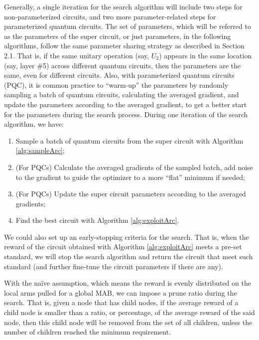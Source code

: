 \documentclass[a4paper,onecolumn,11pt]{quantumarticle}
\begin{document}
    
Generally, a single iteration for the search algorithm will include two steps for non-parameterized circuits, and two more parameter-related steps for parameterized quantum circuits. The set of parameters, which will be referred to as the parameters of the super circuit, or just parameters, in the following algorithms, follow the same parameter sharing strategy as described in Section 2.1. That is, if the same unitary operation (say, $U_2$) appears in the same location (say, layer \#5) across different quantum circuits, then the parameters are the same, even for different circuits. Also, with parameterized quantum circuits (PQC), it is common practice to ``warm-up'' the parameters by randomly sampling a batch of quantum circuits, calculating the averaged gradient, and update the parameters according to the averaged gradient, to get a better start for the parameters during the search process. During one iteration of the search algorithm, we have:
\begin{enumerate}
    \item Sample a batch of quantum circuits from the super circuit with Algorithm \ref{alg:sampleArc};
    \item (For PQCs) Calculate the averaged gradients of the sampled batch, add noise to the gradient to guide the optimizer to a more ``flat'' minimum if needed;
    \item (For PQCs) Update the super circuit parameters according to the averaged gradients;
    \item Find the best circuit with Algorithm \ref{alg:exploitArc}.
\end{enumerate}

We could also set up an early-stopping criteria for the search. That is, when the reward of the circuit obtained with Algorithm \ref{alg:exploitArc} meets a pre-set standard, we will stop the search algorithm and return the circuit that meet such standard (and further fine-tune the circuit parameters if there are any).

With the na\"ive assumption, which means the reward is evenly distributed on the local arms pulled for a global MAB, we can impose a prune ratio during the search. That is, given a node that has child nodes, if the average reward of a child node is smaller than a ratio, or percentage, of the average reward of the said node, then this child node will be removed from the set of all children, unless the number of children reached the minimum requirement.
\end{document}
